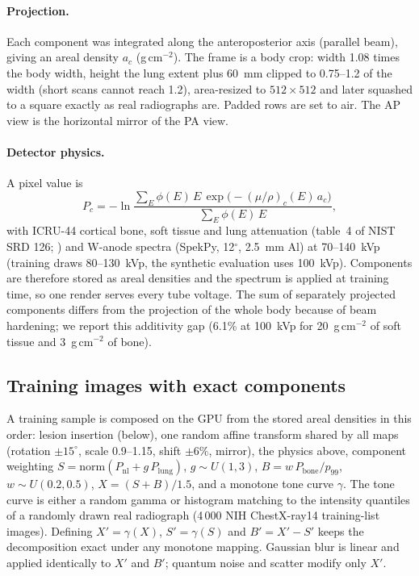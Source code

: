 \paragraph{Projection.} Each component was integrated along the anteroposterior axis (parallel beam), giving an areal density $a_c$ (g\,cm$^{-2}$).
The frame is a body crop: width 1.08 times the body width, height the lung extent plus 60~mm clipped to 0.75--1.2 of the width (short scans cannot
reach 1.2), area-resized to $512\times512$ and later squashed to a square exactly as real radiographs are. Padded rows are set to air.
The AP view is the horizontal mirror of the PA view.

\paragraph{Detector physics.} A pixel value is
\begin{equation}
P_c=-\ln\frac{\sum_E \phi(E)\,E\,\exp\!\big(-(\mu/\rho)_c(E)\,a_c\big)}{\sum_E\phi(E)\,E},
\label{eq:physics}
\end{equation}
with ICRU-44 \citep{icru1989report44} cortical bone, soft tissue and lung attenuation (table~4 of NIST SRD 126; \citealp{hubbell2004xraymass}) and W-anode spectra (SpekPy, 12$^\circ$, 2.5~mm Al) at
70--140~kVp (training draws 80--130~kVp, the synthetic evaluation uses 100~kVp). Components are therefore stored as areal densities and the
spectrum is applied at training time, so one render serves every tube voltage.
The sum of separately projected components differs from the projection of the whole body because of beam hardening; we report this
additivity gap (6.1\% at 100~kVp for 20~g\,cm$^{-2}$ of soft tissue and 3~g\,cm$^{-2}$ of bone).

\subsection{Training images with exact components}
A training sample is composed on the GPU from the stored areal densities in this order: lesion insertion (below), one random affine transform shared by all maps
(rotation $\pm15^\circ$, scale 0.9--1.15, shift $\pm6\%$, mirror), the physics above, component weighting
$S=\mathrm{norm}(P_{\mathrm{nl}}+g\,P_{\mathrm{lung}})$, $g\sim U(1,3)$, $B=w\,P_{\mathrm{bone}}/p_{99}$, $w\sim U(0.2,0.5)$,
$X=(S+B)/1.5$, and a monotone tone curve $\gamma$. The tone curve is either a random gamma or histogram matching to the intensity quantiles of a randomly
drawn real radiograph (4\,000 NIH ChestX-ray14 training-list images). Defining $X'=\gamma(X)$, $S'=\gamma(S)$ and $B'=X'-S'$ keeps the
decomposition exact under any monotone mapping. Gaussian blur is linear and applied identically to $X'$ and $B'$; quantum noise and scatter
modify only $X'$.

